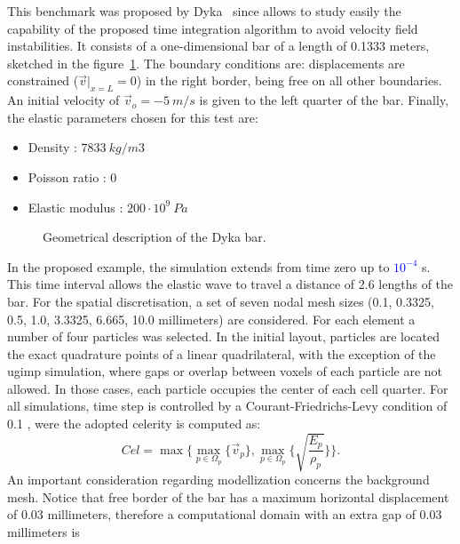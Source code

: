 \documentclass[preprint,12pt,a4paper]{elsarticle}
\begin{document}
This benchmark was proposed by Dyka~\cite{Dyka1995} since allows to study easily the capability
of the proposed time integration algorithm to avoid velocity
field instabilities. It consists of a one-dimensional bar of a length
of 0.1333 meters, sketched in the figure~\ref{fig:Dyka_Bar}. The
boundary conditions are: displacements are constrained ($\vec{v}
\rvert_{x=L} = 0$) in the right border, being free on all other boundaries. An initial velocity of $\vec{v}_o = - 5\ m/s$ is given to the
left quarter of the bar. Finally, the elastic parameters chosen for this test are:
\begin{itemize} 
\item  Density : $7833\ kg/m3$
\item  Poisson ratio : $0$
\item  Elastic modulus : $200 \cdot 10^9\ Pa$
\end{itemize}
\begin{figure}
  \centering
  \resizebox{\hsize}{!}{
    }
  \caption{Geometrical description of the Dyka \cite{Dyka1995} bar.}
  \label{fig:Dyka_Bar}
\end{figure}
In the proposed example, the simulation extends from time zero up to \textcolor{blue}{$10^{-4}$} s.
This time interval allows the elastic wave to travel a distance of 2.6
lengths of the bar. For the spatial discretisation, a set of seven nodal mesh sizes (0.1, 0.3325, 0.5, 1.0, 3.3325, 6.665, 10.0 millimeters) are considered. For each element a number of four particles was selected. In the initial layout, particles are located the exact quadrature points of a linear quadrilateral, with the exception of the \acrshort{ugimp} simulation, where gaps or overlap between
voxels of each particle are not allowed. In those cases, each particle occupies the center of each cell quarter. For all simulations, time step is controlled by a Courant-Friedrichs-Levy condition of 0.1 , were the adopted celerity is computed as:
\begin{equation}
  \label{eq:Cel}
  Cel = \max\{\max_{p \in \Omega_p}\{ \vec{v}_p \} , \max_{p \in \Omega_p}\{ \sqrt{\frac{E_p}{\rho_p}} \} \}.
\end{equation}
An important consideration regarding modellization concerns the
background mesh. Notice that free border of the bar has a maximum
horizontal displacement of 0.03 millimeters, therefore 
a computational domain with an extra gap of 0.03 millimeters is
\end{document}
